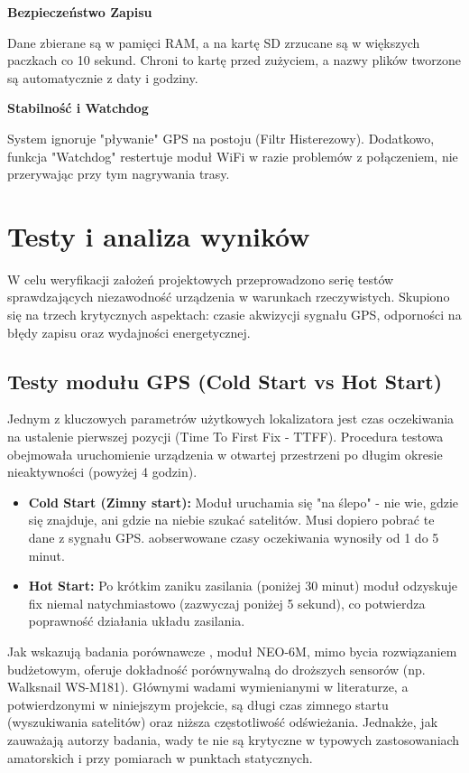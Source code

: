 \documentclass[12pt, a4paper]{EE-dyplom}
\begin{document}
\vspace{0.5cm}
\textbf{Bezpieczeństwo Zapisu}

Dane zbierane są w pamięci RAM, a na kartę SD zrzucane są w większych paczkach co 10 sekund. Chroni to kartę przed zużyciem, a nazwy plików tworzone są automatycznie z daty i godziny.

\vspace{0.5cm}
\textbf{Stabilność i Watchdog}

System ignoruje "pływanie" GPS na postoju (Filtr Histerezowy). Dodatkowo, funkcja "Watchdog" restertuje moduł WiFi w razie problemów z połączeniem, nie przerywając przy tym nagrywania trasy.

\section{Testy i analiza wyników}

W celu weryfikacji założeń projektowych przeprowadzono serię testów sprawdzających niezawodność urządzenia w warunkach rzeczywistych. Skupiono się na trzech krytycznych aspektach: czasie akwizycji sygnału GPS, odporności na błędy zapisu oraz wydajności energetycznej.

\subsection{Testy modułu GPS (Cold Start vs Hot Start)}
Jednym z kluczowych parametrów użytkowych lokalizatora jest czas oczekiwania na ustalenie pierwszej pozycji (Time To First Fix - TTFF). Procedura testowa obejmowała uruchomienie urządzenia w otwartej przestrzeni po długim okresie nieaktywności (powyżej 4 godzin).

\begin{itemize}
    \item \textbf{Cold Start (Zimny start):} Moduł uruchamia się "na ślepo" - nie wie, gdzie się znajduje,
     ani gdzie na niebie szukać satelitów. Musi dopiero pobrać te dane z sygnału GPS. 
     aobserwowane czasy oczekiwania wynosiły od 1 do 5 minut.  
    \item \textbf{Hot Start:} Po krótkim zaniku zasilania (poniżej 30 minut) moduł odzyskuje fix niemal natychmiastowo (zazwyczaj poniżej 5 sekund), co potwierdza poprawność działania układu zasilania.
\end{itemize}

Jak wskazują badania porównawcze \cite{gps_comparison_2025}, moduł NEO-6M, mimo bycia rozwiązaniem budżetowym, oferuje dokładność porównywalną do droższych sensorów (np. Walksnail WS-M181). Głównymi wadami wymienianymi w literaturze, a potwierdzonymi w niniejszym projekcie, są długi czas zimnego startu (wyszukiwania satelitów) oraz niższa częstotliwość odświeżania. Jednakże, jak zauważają autorzy badania, wady te nie są krytyczne w typowych zastosowaniach amatorskich i przy pomiarach w punktach statycznych.
\end{document}

